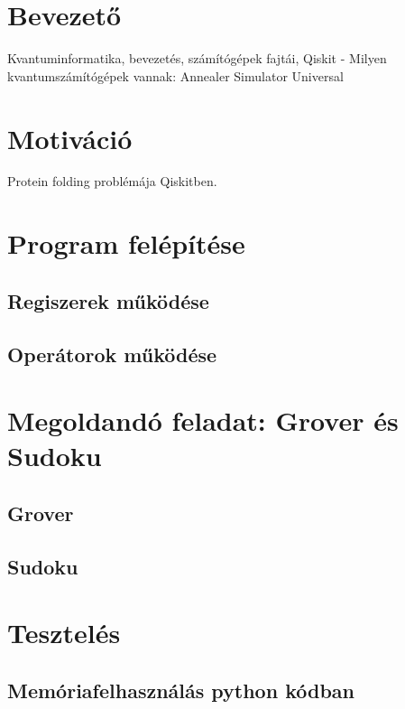 \documentclass[11pt,a4paper,oneside]{report}
\begin{document}
\selectthesislanguage

\tableofcontents\vfill




\chapter{Bevezető}

Kvantuminformatika, bevezetés, számítógépek fajtái, Qiskit
- Milyen kvantumszámítógépek vannak:
  Annealer
  Simulator
  Universal
  
\chapter{Motiváció}

Protein folding problémája Qiskitben.


\chapter{Program felépítése}

\section{Regiszerek működése}

\section{Operátorok működése}

\chapter{Megoldandó feladat: Grover és Sudoku}

\section{Grover}

\section{Sudoku}

\chapter{Tesztelés}
\section{Memóriafelhasználás python kódban}
\end{document}
